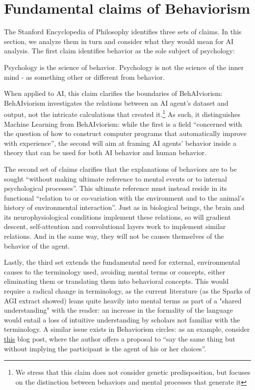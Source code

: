 \documentclass[letterpaper,11pt,twocolumn]{article}
\begin{document}
\section*{Fundamental claims of Behaviorism}
The Stanford Encyclopedia of Philosophy \cite{grahamBehaviorism2023} identifies three sets of claims. In this section, we analyze them in turn and consider what they would mean for AI analysis.
The first claim identifies behavior as the sole subject of psychology:
\begin{displayquote}
    Psychology is the science of behavior. Psychology is not the science of the inner mind - as something other or different from behavior.
\end{displayquote}
When applied to AI, this claim clarifies the boundaries of BehAIviorism: BehAIviorism investigates the relations between an AI agent's dataset and output, not the intricate calculations that created it.\footnote[2]{We stress that this claim does not consider genetic predisposition, but focuses on the distinction between behaviors and mental processes that generate it} As such, it distinguishes Machine Learning from BehAIviorism: while the first is a field \enquote{concerned with the question of how to construct computer programs that automatically improve with experience}\cite{mitchellMachineLearning1997}, the second will aim at framing AI agents' behavior inside a theory that can be used for both AI behavior and human behavior. 


The second set of claims clarifies that the explanations of behaviors are to be sought
\enquote{without making ultimate reference to mental events or to internal psychological processes}.
This ultimate reference must instead reside in its functional \enquote{relation to or co-variation with the environment and to the animal's history of environmental interaction}. Just as in biological beings, the brain and its neurophysiological conditions implement these relations, so will gradient descent, self-attention and convolutional layers work to implement similar relations. And in the same way, they will not be causes themselves of the behavior of the agent.

Lastly, the third set extends the fundamental need for external, environmental causes to the terminology used, avoiding mental terms or concepts, either eliminating them or translating them into behavioral concepts. This would require a radical change in terminology, as the current literature (as the Sparks of AGI \cite{bubeckSparksArtificialGeneral2023} extract showed) leans quite heavily into mental terms as part of a "shared understanding" with the reader: an increase in the formality of the language would entail a loss of intuitive understanding by scholars not familiar with the terminology. A similar issue exists in Behaviorism circles: as an example, consider \href{https://abatechnologies.com/blog/behavior-analysiss-not-so-secret-agent}{this} blog post\cite{lattalBehaviorAnalysisNotSoSecret2020}, where the author offers a proposal to \enquote{say the same thing but without implying the participant is the agent of his or her choices}.
\end{document}
